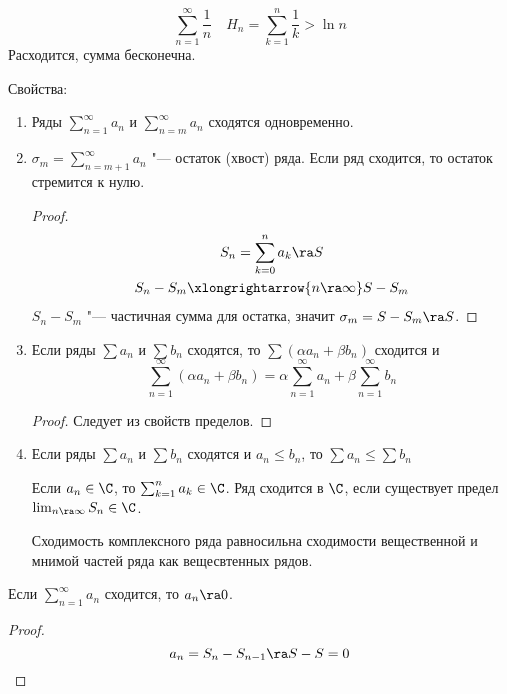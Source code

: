 \begin{exmp}
	\[
		\sum_{n=1}^\infty \frac1n \quad H_n = \sum_{k=1}^n \frac1k > \ln n
	\]
	Расходится, сумма бесконечна.
\end{exmp}

Свойства:
\begin{enumerate}
\item
	Ряды $\sum_{n=1}^\infty a_n$ и $\sum_{n=m}^\infty a_n$ сходятся одновременно.

\item
	$\sigma_m = \sum_{n=m+1}^\infty a_n$ "--- остаток (хвост) ряда.
	Если ряд сходится, то остаток стремится к нулю.
	\begin{proof}
		\begin{gather*}
			S_n = \sum_{k=0}^n a_k \ra S \\
			S_n - S_m \xlongrightarrow{n \ra \infty} S - S_m
		\end{gather*}
		$S_n - S_m$ "--- частичная сумма для остатка, значит $\sigma_m = S - S_m \ra S$.
	\end{proof}

\item
	Если ряды $\sum a_n$ и $\sum b_n$ сходятся, то $\sum (\alpha a_n + \beta b_n)$ сходится и
	\[ \sum_{n=1}^\infty (\alpha a_n + \beta b_n) = \alpha \sum_{n=1}^\infty a_n + \beta \sum_{n=1}^\infty b_n \]
	\begin{proof}
		Следует из свойств пределов.
	\end{proof}

\item
	Если ряды $\sum a_n$ и $\sum b_n$ сходятся и $a_n \le b_n$, то $\sum a_n \le \sum b_n$

\begin{Def}
	Если $a_n \in \C$, то $\sum_{k=1}^n a_k \in \C$. Ряд сходится в $\C$, если существует предел $\lim_{n\ra\infty} S_n \in \C$.
\end{Def}
\begin{Rem}
	Сходимость комплексного ряда равносильна сходимости вещественной и мнимой частей ряда как вещесвтенных рядов.
\end{Rem}
\end{enumerate}

\begin{theorem}
	Если $\sum_{n=1}^\infty a_n$ сходится, то $a_n \ra 0$.
\end{theorem}
\begin{proof}
	\[ a_n = S_n - S_{n-1} \ra S - S = 0 \]
\end{proof}

